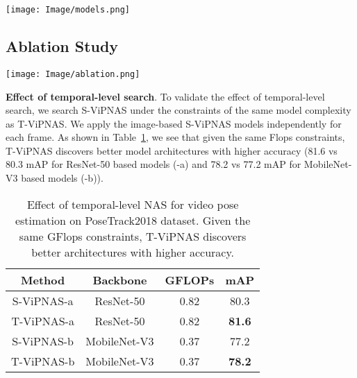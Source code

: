 \documentclass[final]{cvpr}
\begin{document}
\begin{figure*}[tb]
\begin{center}
	\texttt{[image: Image/models.png]}
	\caption{Example of T-ViPNAS with ResNet-50 backbone. \{Depth, Width, Kernel Size, Group\} are listed in the figure. 
	}
	\label{fig:network_architecture}
	\end{center}
	\vspace{-10pt}
\end{figure*}

\subsection{Ablation Study}

\begin{figure*}[tb]
	\centering
	\texttt{[image: Image/ablation.png]}
	\caption{Comparing T-ViPNAS with (a) baselines without temporal feature fusion modules (b) baselines with the same architectures for different frames. We see that our proposed T-ViPNAS consistently improves over the baseline architectures for a range of complexity levels (from 0.8 to 1.2 GFlops). We visualize the architecture of one example T-ViPNAS (red star) in Figure~\ref{fig:network_architecture}. }
	\label{fig:ablation}
\end{figure*}


\textbf{Effect of temporal-level search}. To validate the effect of temporal-level search, we search S-ViPNAS under the constraints of the same model complexity as T-ViPNAS. We apply the image-based S-ViPNAS models independently for each frame. As shown in Table~\ref{tab:samllS}, we see that given the same Flops constraints, T-ViPNAS discovers better model architectures with higher accuracy (81.6 vs 80.3 mAP for ResNet-50 based models (-a) and 78.2 vs 77.2 mAP for MobileNet-V3 based models (-b)).

\begin{table}[tb]
	\begin{center}
	\caption{Effect of temporal-level NAS for video pose estimation on PoseTrack2018 dataset. Given the same GFlops constraints, T-ViPNAS discovers better architectures with higher accuracy.}
		\begin{tabular}{c|c|c|c}
			\hline
			Method & Backbone &  GFLOPs  &  mAP  \\\hline
			S-ViPNAS-a & ResNet-50  & 0.82  & 80.3 \\
            T-ViPNAS-a & ResNet-50   & 0.82  & \textbf{81.6} \\ \hline
		    S-ViPNAS-b & MobileNet-V3   & 0.37  & 77.2 \\
		    T-ViPNAS-b & MobileNet-V3  & 0.37  & \textbf{78.2} \\ \hline
		\end{tabular}
	\label{tab:samllS}
	\end{center}
	\vspace{-15pt}
\end{table}
\end{document}
